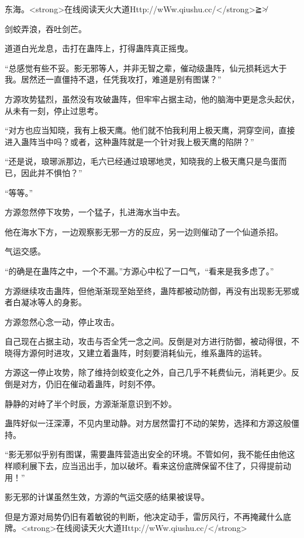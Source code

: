 
\begin{this_body}

东海。<strong>在线阅读天火大道Http://wWw.qiushu.cc/</strong>≧≯

剑蛟弄浪，吞吐剑芒。

道道白光龙息，击打在蛊阵上，打得蛊阵真正摇曳。

“总感觉有些不妥。影无邪等人，并非无智之辈，催动级蛊阵，仙元损耗远大于我。居然还一直僵持不退，任凭我攻打，难道是别有图谋？”

方源攻势猛烈，虽然没有攻破蛊阵，但牢牢占据主动，他的脑海中更是念头起伏，从未有一刻，停止过思考。

“对方也应当知晓，我有上极天鹰。他们就不怕我利用上极天鹰，洞穿空间，直接进入蛊阵当中吗？或者，这种蛊阵就是一个针对我上极天鹰的陷阱？”

“还是说，琅琊派那边，毛六已经通过琅琊地灵，知晓我的上极天鹰只是鸟蛋而已，因此并不惧怕？”

“等等。”

方源忽然停下攻势，一个猛子，扎进海水当中去。

他在海水下方，一边观察影无邪一方的反应，另一边则催动了一个仙道杀招。

气运交感。

“的确是在蛊阵之中，一个不漏。”方源心中松了一口气，“看来是我多虑了。”

方源继续攻击蛊阵，但他渐渐现至始至终，蛊阵都被动防御，再没有出现影无邪或者白凝冰等人的身影。

方源忽然心念一动，停止攻击。

自己现在占据主动，攻击与否全凭一念之间。反倒是对方进行防御，被动得很，不晓得方源何时进攻，又建立着蛊阵，时刻要消耗仙元，维系蛊阵的运转。

方源这一停止攻势，除了维持剑蛟变化之外，自己几乎不耗费仙元，消耗更少。反倒是对方，仍旧在催动着蛊阵，时刻不停。

静静的对峙了半个时辰，方源渐渐意识到不妙。

蛊阵好似一汪深潭，不见内里动静。对方居然雷打不动的架势，选择和方源这般僵持。

“影无邪似乎别有图谋，需要蛊阵营造出安全的环境。不管如何，我不能任由他这样顺利展下去，应当迅出手，加以破坏。看来这份底牌保留不住了，只得提前动用！”

影无邪的计谋虽然生效，方源的气运交感的结果被误导。

但是方源对局势仍旧有着敏锐的判断，他决定动手，雷厉风行，不再掩藏什么底牌。<strong>在线阅读天火大道Http://wWw.qiushu.cc/</strong>


\end{this_body}
